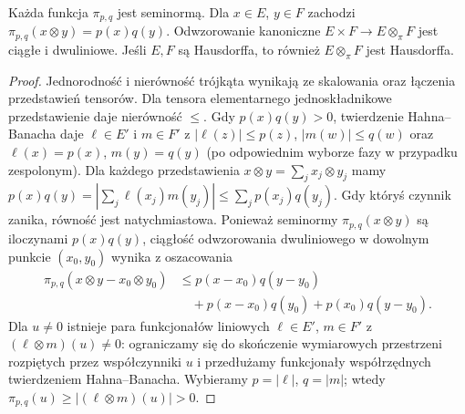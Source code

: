\begin{lemat}
\label{lem:pi-properties24}
Każda funkcja $\pi_{p,q}$ jest seminormą. Dla $x\in E$,
$y\in F$ zachodzi $\pi_{p,q}(x\otimes y)=p(x)q(y)$.
Odwzorowanie kanoniczne $E\times F\to E\otimes_\pi F$
jest ciągłe i dwuliniowe. Jeśli $E,F$ są Hausdorffa,
to również $E\otimes_\pi F$ jest Hausdorffa.
\end{lemat}
\begin{proof}
Jednorodność i nierówność trójkąta wynikają ze skalowania
oraz łączenia przedstawień tensorów. Dla tensora elementarnego
jednoskładnikowe przedstawienie daje nierówność $\le$.
Gdy $p(x)q(y)>0$, twierdzenie Hahna--Banacha daje
$\ell\in E'$ i $m\in F'$ z $|\ell(z)|\le p(z)$,
$|m(w)|\le q(w)$ oraz $\ell(x)=p(x)$, $m(y)=q(y)$
(po odpowiednim wyborze fazy w przypadku zespolonym).
Dla każdego przedstawienia $x\otimes y=\sum_jx_j\otimes y_j$
mamy $p(x)q(y)=|\sum_j\ell(x_j)m(y_j)|
\le\sum_jp(x_j)q(y_j)$. Gdy któryś czynnik zanika,
równość jest natychmiastowa. Ponieważ seminormy
$\pi_{p,q}(x\otimes y)$ są iloczynami $p(x)q(y)$,
ciągłość odwzorowania dwuliniowego w dowolnym punkcie
$(x_0,y_0)$ wynika z oszacowania
\[
\begin{aligned}
\pi_{p,q}(x\otimes y-x_0\otimes y_0)
&\le p(x-x_0)q(y-y_0)\\
&\quad+p(x-x_0)q(y_0)+p(x_0)q(y-y_0).
\end{aligned}
\] Dla $u\ne0$ istnieje para funkcjonałów
liniowych $\ell\in E'$, $m\in F'$ z
$(\ell\otimes m)(u)\ne0$: ograniczamy się do skończenie
wymiarowych przestrzeni rozpiętych przez współczynniki $u$
i przedłużamy funkcjonały współrzędnych twierdzeniem
Hahna--Banacha. Wybieramy $p=|\ell|$, $q=|m|$;
wtedy $\pi_{p,q}(u)\ge|(\ell\otimes m)(u)|>0$.
\end{proof}

